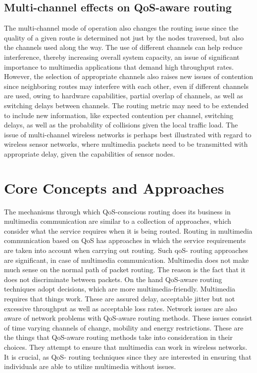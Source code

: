 \documentclass[12pt]{article}
\begin{document}
\subsection{Multi-channel effects on QoS-aware routing}
The multi-channel mode of operation also changes the routing issue since the quality of a given route is determined not just by the nodes traversed, but also the channels used along the way. The use of different channels can help reduce interference, thereby increasing overall system capacity, an issue of significant importance to multimedia applications that demand high throughput rates. However, the selection of appropriate channels also raises new issues of contention since neighboring routes may interfere with each other, even if different channels are used, owing to hardware capabilities, partial overlap of channels, as well as switching delays between channels. The routing metric may need to be extended to include new information, like expected contention per channel, switching delays, as well as the probability of collisions given the local traffic load. The issue of multi-channel wireless networks is perhaps best illustrated with regard to wireless sensor networks, where multimedia packets need to be transmitted with appropriate delay, given the capabilities of sensor nodes.

	

	\section{Core Concepts and Approaches}
    The mechanisms \cite{Fan2019CrossLayerLyapunov}through which QoS-conscious routing does its business in multimedia communication are similar to a collection of approaches, which consider what the service requires when it is being routed. Routing in multimedia communication based on QoS has approaches in which the service requirements are taken into account when carrying out routing. Such qoS- routing approaches are significant, in case of multimedia communication. Multimedia does not make much sense on the normal path of packet routing. The reason is the fact that it does not discriminate between packets. On the hand QoS-aware routing techniques adopt decisions, which are more multimedia-friendly. Multimedia requires that things work. These are assured delay, acceptable jitter but not excessive throughput as well as acceptable loss rates. Network issues are also aware of network problems with QoS-aware routing methods. These issues consist of time varying channels of change, mobility and energy restrictions. These are the things that QoS-aware routing methods take into consideration in their choices. They attempt to ensure that multimedia can work in wireless networks. It is crucial, as QoS- routing techniques since they are interested in ensuring that individuals are able to utilize multimedia without issues.
\end{document}
